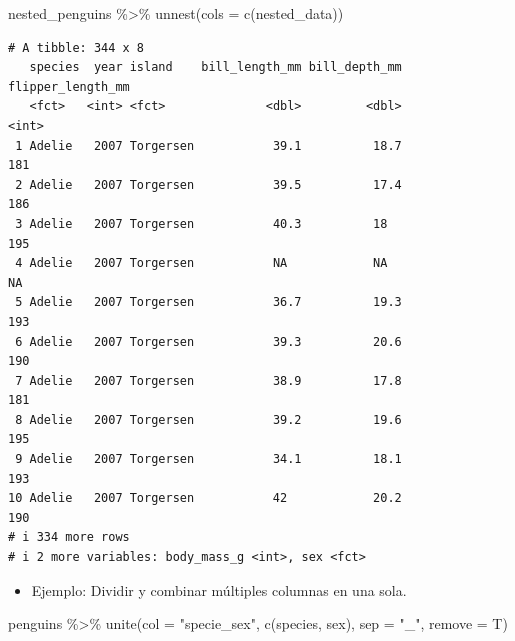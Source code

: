 \documentclass[
  letterpaper,
  DIV=11,
  numbers=noendperiod]{scrreprt}
\newenvironment{Shaded}{\begin{snugshade}}{\end{snugshade}}
\newcommand{\AttributeTok}[1]{\textcolor[rgb]{0.40,0.45,0.13}{#1}}
\newcommand{\FunctionTok}[1]{\textcolor[rgb]{0.28,0.35,0.67}{#1}}
\newcommand{\NormalTok}[1]{\textcolor[rgb]{0.00,0.23,0.31}{#1}}
\newcommand{\SpecialCharTok}[1]{\textcolor[rgb]{0.37,0.37,0.37}{#1}}
\newcommand{\StringTok}[1]{\textcolor[rgb]{0.13,0.47,0.30}{#1}}
\providecommand{\tightlist}{%
  \setlength{\itemsep}{0pt}\setlength{\parskip}{0pt}}\usepackage{longtable,booktabs,array}
\begin{document}
\begin{Shaded}
\begin{Highlighting}[]
\NormalTok{nested\_penguins }\SpecialCharTok{\%\textgreater{}\%} \FunctionTok{unnest}\NormalTok{(}\AttributeTok{cols =} \FunctionTok{c}\NormalTok{(nested\_data)) }
\end{Highlighting}
\end{Shaded}

\begin{verbatim}
# A tibble: 344 x 8
   species  year island    bill_length_mm bill_depth_mm flipper_length_mm
   <fct>   <int> <fct>              <dbl>         <dbl>             <int>
 1 Adelie   2007 Torgersen           39.1          18.7               181
 2 Adelie   2007 Torgersen           39.5          17.4               186
 3 Adelie   2007 Torgersen           40.3          18                 195
 4 Adelie   2007 Torgersen           NA            NA                  NA
 5 Adelie   2007 Torgersen           36.7          19.3               193
 6 Adelie   2007 Torgersen           39.3          20.6               190
 7 Adelie   2007 Torgersen           38.9          17.8               181
 8 Adelie   2007 Torgersen           39.2          19.6               195
 9 Adelie   2007 Torgersen           34.1          18.1               193
10 Adelie   2007 Torgersen           42            20.2               190
# i 334 more rows
# i 2 more variables: body_mass_g <int>, sex <fct>
\end{verbatim}

\begin{itemize}
\tightlist
\item
  {Ejemplo}: Dividir y combinar múltiples columnas en una sola.
\end{itemize}

\begin{Shaded}
\begin{Highlighting}[]
\NormalTok{penguins }\SpecialCharTok{\%\textgreater{}\%} \FunctionTok{unite}\NormalTok{(}\AttributeTok{col =} \StringTok{"specie\_sex"}\NormalTok{,}
                   \FunctionTok{c}\NormalTok{(species, sex), }\AttributeTok{sep =} \StringTok{"\_"}\NormalTok{, }\AttributeTok{remove =}\NormalTok{ T)}
\end{Highlighting}
\end{Shaded}
\end{document}
